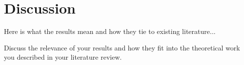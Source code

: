 \chapter{Discussion}
\label{ch_discussion}

Here is what the results mean and how they tie to existing literature...

Discuss the relevance of your results and how they fit into the theoretical work you described in your
literature review.
